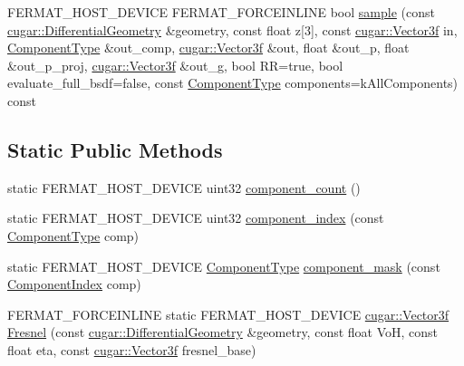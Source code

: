 \begin{DoxyCompactItemize}
\item 
F\+E\+R\+M\+A\+T\+\_\+\+H\+O\+S\+T\+\_\+\+D\+E\+V\+I\+CE F\+E\+R\+M\+A\+T\+\_\+\+F\+O\+R\+C\+E\+I\+N\+L\+I\+NE bool \hyperlink{struct_bsdf_ac4ce2cad14795e1ff7f82ed10990ba3e}{sample} (const \hyperlink{structcugar_1_1_differential_geometry}{cugar\+::\+Differential\+Geometry} \&geometry, const float z\mbox{[}3\mbox{]}, const \hyperlink{structcugar_1_1_vector}{cugar\+::\+Vector3f} in, \hyperlink{struct_bsdf_a5f7db6f81220ed9ee6da109d6eb5b585}{Component\+Type} \&out\+\_\+comp, \hyperlink{structcugar_1_1_vector}{cugar\+::\+Vector3f} \&out, float \&out\+\_\+p, float \&out\+\_\+p\+\_\+proj, \hyperlink{structcugar_1_1_vector}{cugar\+::\+Vector3f} \&out\+\_\+g, bool RR=true, bool evaluate\+\_\+full\+\_\+bsdf=false, const \hyperlink{struct_bsdf_a5f7db6f81220ed9ee6da109d6eb5b585}{Component\+Type} components=k\+All\+Components) const
\end{DoxyCompactItemize}
\subsection*{Static Public Methods}
\begin{DoxyCompactItemize}
\item 
static F\+E\+R\+M\+A\+T\+\_\+\+H\+O\+S\+T\+\_\+\+D\+E\+V\+I\+CE uint32 \hyperlink{struct_bsdf_a121bc781731366b8846d9a7b36eb7767}{component\+\_\+count} ()
\item 
static F\+E\+R\+M\+A\+T\+\_\+\+H\+O\+S\+T\+\_\+\+D\+E\+V\+I\+CE uint32 \hyperlink{struct_bsdf_a0eccbf03af0e1d86cee1d7ebd1d5e752}{component\+\_\+index} (const \hyperlink{struct_bsdf_a5f7db6f81220ed9ee6da109d6eb5b585}{Component\+Type} comp)
\item 
static F\+E\+R\+M\+A\+T\+\_\+\+H\+O\+S\+T\+\_\+\+D\+E\+V\+I\+CE \hyperlink{struct_bsdf_a5f7db6f81220ed9ee6da109d6eb5b585}{Component\+Type} \hyperlink{struct_bsdf_a6f95cfb6e2c6988cef49c8dcaefda5e6}{component\+\_\+mask} (const \hyperlink{struct_bsdf_acaa87fb810c0f7957db85bf41843f70c}{Component\+Index} comp)
\item 
F\+E\+R\+M\+A\+T\+\_\+\+F\+O\+R\+C\+E\+I\+N\+L\+I\+NE static F\+E\+R\+M\+A\+T\+\_\+\+H\+O\+S\+T\+\_\+\+D\+E\+V\+I\+CE \hyperlink{structcugar_1_1_vector}{cugar\+::\+Vector3f} \hyperlink{struct_bsdf_aa35356849fd5563fe53584fa45ca3714}{Fresnel} (const \hyperlink{structcugar_1_1_differential_geometry}{cugar\+::\+Differential\+Geometry} \&geometry, const float VoH, const float eta, const \hyperlink{structcugar_1_1_vector}{cugar\+::\+Vector3f} fresnel\+\_\+base)
\end{DoxyCompactItemize}
